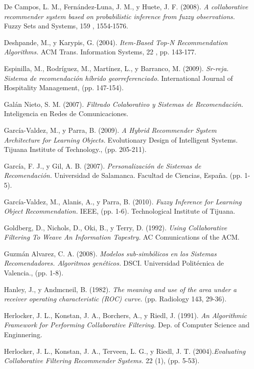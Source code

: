 \documentclass[12pt,letterpaper,oneside] {memoir}
\begin{document}
\begin{thebibliography}{99}
 De Campos, L. M., Fernández-Luna, J. M., y Huete, J. F. (2008).\textit{ A collaborative recommender system based on probabilistic inference from fuzzy observations.} Fuzzy Sets and Systems, 159 , 1554-1576.

 Deshpande, M., y Karypis, G. (2004). \textit{Item-Based Top-N Recommendation Algorithms.} ACM Trans. Information Systems, 22 , pp. 143-177.

 Espinilla, M., Rodríguez, M., Martínez, L., y Barranco, M. (2009). \textit{Sr-reja. Sistema de recomendación híbrido georreferenciado.} International Journal of Hospitality Management, (pp. 147-154).

 Galán Nieto, S. M. (2007). \textit{Filtrado Colaborativo y Sistemas de Recomendación.} Inteligencia en Redes de Comunicaciones.

 García-Valdez, M., y Parra, B. (2009). \textit{A Hybrid Recommender System Architecture for Learning Objects.} Evolutionary Design of Intelligent Systems. Tijuana Institute of Technology., (pp. 205-211).

 García, F. J., y Gil, A. B. (2007).\textit{ Personalización de Sistemas de Recomendación.} Universidad de Salamanca. Facultad de Ciencias, España. (pp. 1-5).

 García-Valdez, M., Alanis, A., y Parra, B. (2010).\textit{ Fuzzy Inference for Learning Object Recommendation.} IEEE, (pp. 1-6). Technological Institute of Tijuana.

 Goldberg, D., Nichols, D., Oki, B., y Terry, D. (1992). \textit{Using Collaborative Filtering To Weave An Information Tapestry.} AC Comunications of the ACM.

 Guzmán  Alvarez, C. A. (2008). \textit{Modelos sub-simbólicos en los Sistemas Recomendadores. Algoritmos genéticos.} DSCI. Universidad Politécnica de Valencia., (pp. 1-8).

 Hanley, J., y Andmcneil, B. (1982). \textit{The meaning and use of the area under a receiver operating characteristic (ROC) curve.} (pp. Radiology 143, 29-36).

 Herlocker, J. L., Konstan, J. A., Borchers, A., y Riedl, J. (1991). \textit{An Algorithmic Framework for Performing Collaborative Filtering.}  Dep. of Computer Science and Enginnering.

 Herlocker, J. L., Konstan, J. A., Terveen, L. G., y Riedl, J. T. (2004).\textit{Evaluating Collaborative Filtering Recommender Systems.} 22 (1), (pp. 5-53).


\end{thebibliography}
\end{document}

